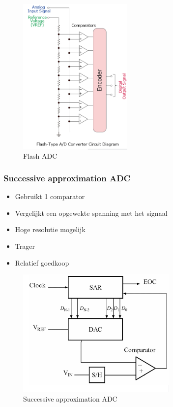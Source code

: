 \documentclass{article}
\begin{document}
\begin{figure}[H]
    \centering
    \includegraphics[width=0.5\textwidth]{Screenshot_20200224_122635.png}
    \caption{Flash ADC}
\end{figure}

\subsubsection{Successive approximation ADC}
\begin{itemize}
    \item Gebruikt 1 comparator
    \item Vergelijkt een opgewekte spanning met het signaal
    \item Hoge resolutie mogelijk
    \item Trager
    \item Relatief goedkoop
\end{itemize}

\begin{figure}[H]
    \centering
    \includegraphics[width=0.7\textwidth]{Screenshot_20200224_122846.png}
    \caption{Successive approximation ADC}
\end{figure}
\end{document}
